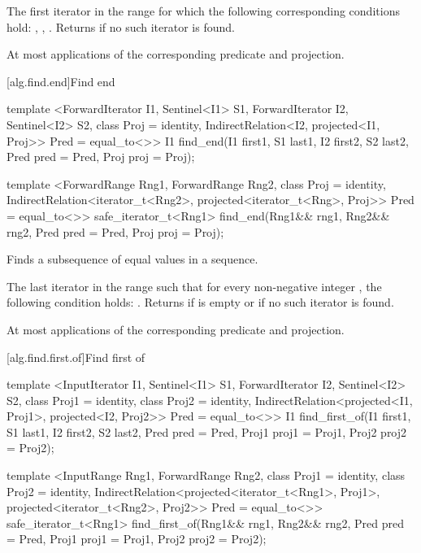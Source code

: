 \begin{itemdescr}
\pnum
\returns
The first iterator
in the range
for which the following corresponding
conditions hold:
,
,
.
Returns  if no such iterator is found.

\pnum
\complexity
At most
applications of the corresponding predicate and projection.
\end{itemdescr}

[alg.find.end]{Find end}

%
\begin{itemdecl}
template <ForwardIterator I1, Sentinel<I1> S1, ForwardIterator I2,
    Sentinel<I2> S2, class Proj = identity,
    IndirectRelation<I2, projected<I1, Proj>> Pred = equal_to<>>
  I1
    find_end(I1 first1, S1 last1, I2 first2, S2 last2,
             Pred pred = Pred{}, Proj proj = Proj{});

template <ForwardRange Rng1, ForwardRange Rng2,
    class Proj = identity,
    IndirectRelation<iterator_t<Rng2>,
      projected<iterator_t<Rng>, Proj>> Pred = equal_to<>>
  safe_iterator_t<Rng1>
    find_end(Rng1&& rng1, Rng2&& rng2, Pred pred = Pred{}, Proj proj = Proj{});
\end{itemdecl}

\begin{itemdescr}
\pnum
\effects
Finds a subsequence of equal values in a sequence.

\pnum
\returns
The last iterator
in the range 
such that for every non-negative integer
,
the following condition holds:
.
Returns 
if
 is empty or if
no such iterator is found.

\pnum
\complexity
At most
applications of the corresponding predicate and projection.
\end{itemdescr}

[alg.find.first.of]{Find first of}

%
\begin{itemdecl}
template <InputIterator I1, Sentinel<I1> S1, ForwardIterator I2, Sentinel<I2> S2,
    class Proj1 = identity, class Proj2 = identity,
    IndirectRelation<projected<I1, Proj1>, projected<I2, Proj2>> Pred = equal_to<>>
  I1
    find_first_of(I1 first1, S1 last1, I2 first2, S2 last2, Pred pred = Pred{},
                  Proj1 proj1 = Proj1{}, Proj2 proj2 = Proj2{});

template <InputRange Rng1, ForwardRange Rng2, class Proj1 = identity,
    class Proj2 = identity,
    IndirectRelation<projected<iterator_t<Rng1>, Proj1>,
      projected<iterator_t<Rng2>, Proj2>> Pred = equal_to<>>
  safe_iterator_t<Rng1>
    find_first_of(Rng1&& rng1, Rng2&& rng2, Pred pred = Pred{},
                  Proj1 proj1 = Proj1{}, Proj2 proj2 = Proj2{});
\end{itemdecl}

